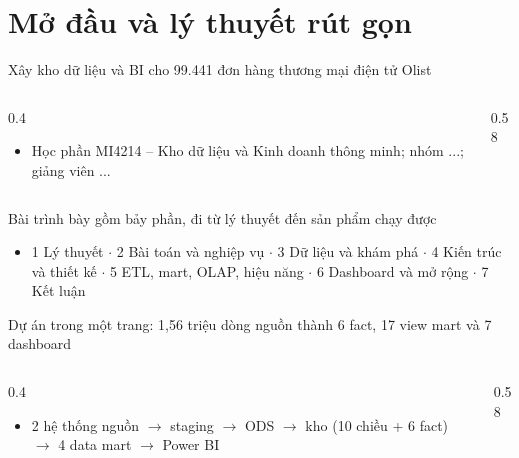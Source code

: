 \section[Lý thuyết]{Mở đầu và lý thuyết rút gọn}

\begin{frame}{Xây kho dữ liệu và BI cho 99.441 đơn hàng thương mại điện tử Olist}
\begin{columns}[T]\begin{column}{0.4\textwidth}
\begin{itemize}
  \item Học phần MI4214 – Kho dữ liệu và Kinh doanh thông minh; nhóm ...; giảng viên ...
\end{itemize}
\end{column}\begin{column}{0.58\textwidth}
\begin{center}\end{center}
\end{column}\end{columns}

\end{frame}

\begin{frame}{Bài trình bày gồm bảy phần, đi từ lý thuyết đến sản phẩm chạy được}
\begin{itemize}
  \item 1 Lý thuyết $\cdot$ 2 Bài toán và nghiệp vụ $\cdot$ 3 Dữ liệu và khám phá $\cdot$ 4 Kiến trúc và thiết kế $\cdot$ 5 ETL, mart, OLAP, hiệu năng $\cdot$ 6 Dashboard và mở rộng $\cdot$ 7 Kết luận
\end{itemize}


\end{frame}

\begin{frame}{Dự án trong một trang: 1,56 triệu dòng nguồn thành 6 fact, 17 view mart và 7 dashboard}
\begin{columns}[T]\begin{column}{0.4\textwidth}
\begin{itemize}
  \item 2 hệ thống nguồn $\rightarrow$ staging $\rightarrow$ ODS $\rightarrow$ kho (10 chiều + 6 fact) $\rightarrow$ 4 data mart $\rightarrow$ Power BI
\end{itemize}
\end{column}\begin{column}{0.58\textwidth}
\begin{center}\end{center}
\end{column}\end{columns}

\end{frame}

